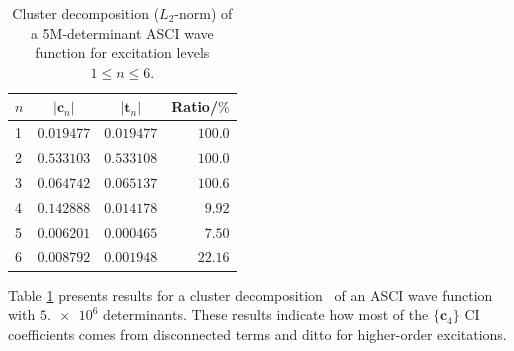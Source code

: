 \documentclass[journal=jcp,manuscript=suppinfo]{achemso}
\begin{document}
%
\begin{table}[ht!]
\begin{center}
\caption{Cluster decomposition ($L_2$-norm) of a 5M-determinant ASCI wave function for excitation levels $1 \leq n \leq 6$.}
\label{cluster_decomp_SI_table}
\begin{tabular}{l|r|r|r}
\toprule
\multicolumn{1}{c|}{$n$} & \multicolumn{1}{c|}{$|\bm{c}_n|$} & \multicolumn{1}{c|}{$|\bm{t}_n|$} & \multicolumn{1}{c}{Ratio/$\%$} \\
\midrule\midrule
1 & $0.019477$ & $0.019477$ & $100.0$ \\
2 & $0.533103$ & $0.533108$ & $100.0$ \\
3 & $0.064742$ & $0.065137$ & $100.6$ \\
4 & $0.142888$ & $0.014178$ & $9.92$ \\
5 & $0.006201$ & $0.000465$ & $7.50$ \\
6 & $0.008792$ & $0.001948$ & $22.16$ \\
\midrule
\end{tabular}
\vspace{-0.6cm}
\end{center}
\end{table}
%
Table \ref{cluster_decomp_SI_table} presents results for a cluster decomposition~\cite{lehtola_head_gordon_fci_decomp_jcp_2017} of an ASCI wave function with $\num{5.e6}$ determinants. These results indicate how most of the $\{\bm{c}_4\}$ CI coefficients comes from disconnected terms and ditto for higher-order excitations. 

\newpage



%
\end{document}
